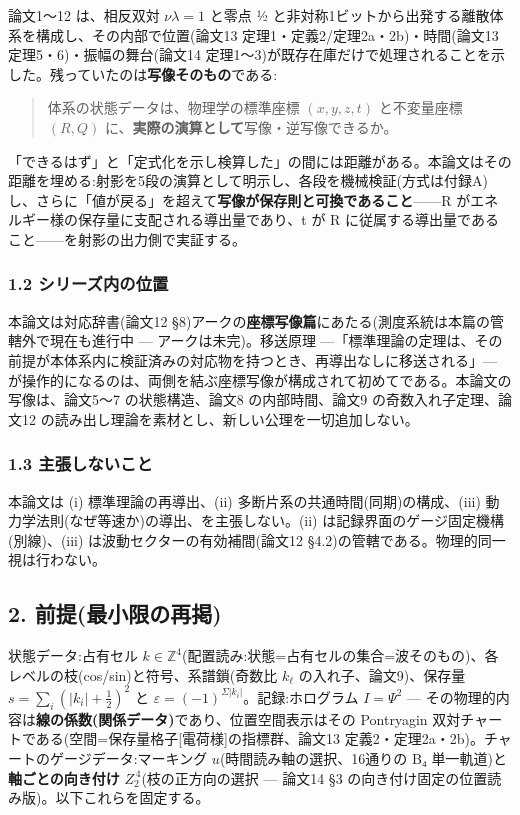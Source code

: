 \documentclass[
]{ltjsarticle}
\begin{document}
論文1〜12 は、相反双対 \(\nu\lambda=1\) と零点 ½
と非対称1ビットから出発する離散体系を構成し、その内部で位置(論文13
定理1・定義2/定理2a・2b)・時間(論文13 定理5・6)・振幅の舞台(論文14
定理1〜3)が既存在庫だけで処理されることを示した。残っていたのは\textbf{写像そのもの}である:

\begin{quote}
体系の状態データは、物理学の標準座標 \((x,y,z,t)\) と不変量座標
\((R,Q)\) に、\textbf{実際の演算として}写像・逆写像できるか。
\end{quote}

「できるはず」と「定式化を示し検算した」の間には距離がある。本論文はその距離を埋める:射影を5段の演算として明示し、各段を機械検証(方式は付録A)し、さらに「値が戻る」を超えて\textbf{写像が保存則と可換であること}------R
がエネルギー様の保存量に支配される導出量であり、t が R
に従属する導出量であること------を射影の出力側で実証する。

\subsubsection{1.2
シリーズ内の位置}\label{ux30b7ux30eaux30fcux30baux5185ux306eux4f4dux7f6e}

本論文は対応辞書(論文12
§8)アークの\textbf{座標写像篇}にあたる(測度系統は本篇の管轄外で現在も進行中
--- アークは未完)。移送原理
---「標準理論の定理は、その前提が本体系内に検証済みの対応物を持つとき、再導出なしに移送される」---
が操作的になるのは、両側を結ぶ座標写像が構成されて初めてである。本論文の写像は、論文5〜7
の状態構造、論文8 の内部時間、論文9 の奇数入れ子定理、論文12
の読み出し理論を素材とし、新しい公理を一切追加しない。

\subsubsection{1.3
主張しないこと}\label{ux4e3bux5f35ux3057ux306aux3044ux3053ux3068}

本論文は (i) 標準理論の再導出、(ii)
多断片系の共通時間(同期)の構成、(iii)
動力学法則(なぜ等速か)の導出、を主張しない。(ii)
は記録界面のゲージ固定機構(別線)、(iii) は波動セクターの有効補間(論文12
§4.2)の管轄である。物理的同一視は行わない。

\subsection{2.
前提(最小限の再掲)}\label{ux524dux63d0ux6700ux5c0fux9650ux306eux518dux63b2}

状態データ:占有セル
\(k\in\mathbb{Z}^4\)(配置読み:状態=占有セルの集合=波そのもの)、各レベルの枝(cos/sin)と符号、系譜鎖(奇数比
\(k_\ell\) の入れ子、論文9)、保存量 \(s=\sum_i(|k_i|+\tfrac12)^2\) と
\(\varepsilon=(-1)^{\Sigma|k_i|}\)。記録:ホログラム \(I=\Psi^2\) ---
その物理的内容は\textbf{線の係数(関係データ)}であり、位置空間表示はその
Pontryagin
双対チャートである(空間=保存量格子{[}電荷様{]}の指標群、論文13
定義2・定理2a・2b)。チャートのゲージデータ:マーキング
\(u\)(時間読み軸の選択、16通りの B₄ 単一軌道)と\textbf{軸ごとの向き付け}
\(Z_2^{\,4}\)(枝の正方向の選択 --- 論文14 §3
の向き付け固定の位置読み版)。以下これらを固定する。
\end{document}
